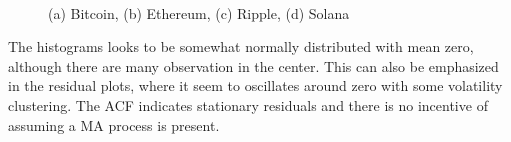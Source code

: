 \begin{figure}[H]
  \centering
  \quad
  \\
  \quad
  \caption{(a) Bitcoin, (b) Ethereum, (c) Ripple, (d) Solana }
  \label{fig:plot_over_residuals}
\end{figure}
\noindent The histograms looks to be somewhat normally distributed with mean zero, although there are many observation in the center. This can also be emphasized in the residual plots, where it seem to oscillates around zero with some volatility clustering.
The ACF indicates stationary residuals and there is no incentive of assuming a MA process is present.


